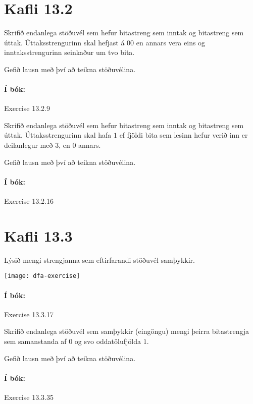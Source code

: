 \documentclass{exam}
\begin{document}
\begin{questions}
\section{Kafli 13.2}

\question Skrifið endanlega stöðuvél sem hefur bitastreng sem inntak og bitastreng sem úttak. Úttaksstrengurinn skal hefjast á $00$ en annars vera eins og inntaksstrengurinn seinkaður um tvo bita.

Gefið lausn með því að teikna stöðuvélina.

\paragraph{Í bók:} Exercise 13.2.9

\question Skrifið endanlega stöðuvél sem hefur bitastreng sem inntak og bitastreng sem úttak. Úttaksstrengurinn skal hafa $1$ ef fjöldi bita sem lesinn hefur verið inn er deilanlegur með 3, en $0$ annars.

Gefið lausn með því að teikna stöðuvélina.

\paragraph{Í bók:} Exercise 13.2.16

\section{Kafli 13.3}

\question Lýsið mengi strengjanna sem eftirfarandi stöðuvél samþykkir.

\begin{center}
\texttt{[image: dfa-exercise]}
\end{center}

\paragraph{Í bók:} Exercise 13.3.17

\question Skrifið endanlega stöðuvél sem samþykkir (eingöngu) mengi þeirra bitastrengja sem samanstanda af $0$ og svo oddatölufjölda $1$.

Gefið lausn með því að teikna stöðuvélina.

\paragraph{Í bók:} Exercise 13.3.35

\end{questions}
\end{document}
